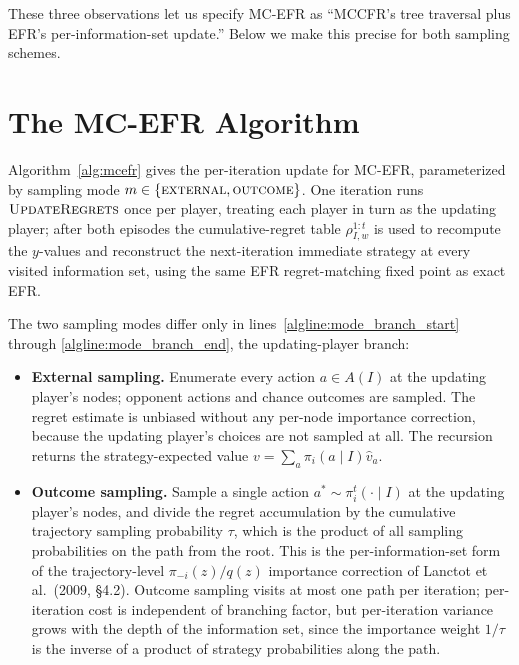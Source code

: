 \documentclass[11pt]{article}
\begin{document}
These three observations let us specify MC-EFR as ``MCCFR's tree traversal plus EFR's per-information-set update.'' Below we make this precise for both sampling schemes.

\section{The MC-EFR Algorithm}
\label{sec:mcefr_ext}

Algorithm~\ref{alg:mcefr} gives the per-iteration update for MC-EFR, parameterized by sampling mode $m \in \{\textsc{external}, \textsc{outcome}\}$. One iteration runs $\textsc{UpdateRegrets}$ once per player, treating each player in turn as the updating player; after both episodes the cumulative-regret table $\rho^{1:t}_{I,w}$ is used to recompute the $y$-values and reconstruct the next-iteration immediate strategy at every visited information set, using the same EFR regret-matching fixed point as exact EFR.

The two sampling modes differ only in lines~\ref{algline:mode_branch_start} through \ref{algline:mode_branch_end}, the updating-player branch:

\begin{itemize}
    \item \textbf{External sampling.} Enumerate every action $a \in A(I)$ at the updating player's nodes; opponent actions and chance outcomes are sampled. The regret estimate is unbiased without any per-node importance correction, because the updating player's choices are not sampled at all. The recursion returns the strategy-expected value $v = \sum_a \pi_i(a \mid I) \hat v_a$.
    \item \textbf{Outcome sampling.} Sample a single action $a^* \sim \pi_i^t(\cdot \mid I)$ at the updating player's nodes, and divide the regret accumulation by the cumulative trajectory sampling probability $\tau$, which is the product of all sampling probabilities on the path from the root. This is the per-information-set form of the trajectory-level $\pi_{-i}(z)/q(z)$ importance correction of Lanctot et al.\ (2009, \S4.2). Outcome sampling visits at most one path per iteration; per-iteration cost is independent of branching factor, but per-iteration variance grows with the depth of the information set, since the importance weight $1/\tau$ is the inverse of a product of strategy probabilities along the path.
\end{itemize}
\end{document}
